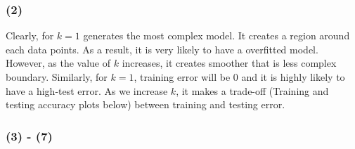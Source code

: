\documentclass[11pt]{article}
\begin{document}
    \hypertarget{section}{%
\subsubsection{(2)}\label{section}}

    Clearly, for \(k = 1\) generates the most complex model. It creates a
region around each data points. As a result, it is very likely to have a
overfitted model. However, as the value of \(k\) increases, it creates
smoother that is less complex boundary. Similarly, for \(k = 1\),
training error will be \(0\) and it is highly likely to have a high-test
error. As we increase \(k\), it makes a trade-off (Training and testing
accuracy plots below) between training and testing error.

    \hypertarget{section}{%
\subsubsection{(3) - (7)}\label{section}}
\end{document}
